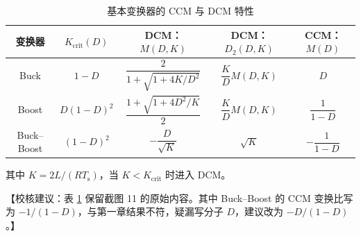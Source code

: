 \documentclass[
  12pt,
  UTF8,
  a4paper,
  fontset=fandol,
  oneside,
  openany
]{ctexrep}
\newcommand{\reviewnote}[1]{%
  \par\smallskip
  {\color{reviewgray}\small\noindent【校核建议：#1】\par}
  \smallskip
}
\begin{document}
\begin{table}[!htbp]
  \centering
  \caption{基本变换器的 CCM 与 DCM 特性}
  \label{tab0402}
  \begingroup
  \small
  \renewcommand{\arraystretch}{2.1}
  \setlength{\tabcolsep}{5pt}
  \begin{tabular}{ccccc}
    \toprule
    \rowcolor{gray!15}
    变换器         & $K_{\mathrm{crit}}(D)$ & DCM：$M(D,K)$                   & DCM：$D_2(D,K)$     & CCM：$M(D)$      \\
    \midrule
    Buck        & $1-D$                  & $\dfrac{2}{1+\sqrt{1+4K/D^2}}$ & $\dfrac KD M(D,K)$ & $D$             \\
    Boost       & $D(1-D)^2$             & $\dfrac{1+\sqrt{1+4D^2/K}}{2}$ & $\dfrac KD M(D,K)$ & $\dfrac1{1-D}$  \\
    Buck--Boost & $(1-D)^2$              & $-\dfrac D{\sqrt K}$           & $\sqrt K$          & $-\dfrac1{1-D}$ \\
    \bottomrule
  \end{tabular}
  \endgroup
\end{table}
其中 $K=2L/(RT_{\mathrm{s}})$，当 $K<K_{\mathrm{crit}}$ 时进入 DCM。
\reviewnote{表 \ref{tab0402} 保留截图 11 的原始内容。其中 Buck--Boost 的 CCM
  变换比写为 $-1/(1-D)$，与第一章结果不符，疑漏写分子 $D$，建议改为 $-D/(1-D)$。}
\end{document}
